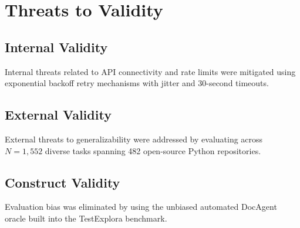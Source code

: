 \section{Threats to Validity}
\label{sec:threats}

\subsection{Internal Validity}
Internal threats related to API connectivity and rate limits were mitigated using exponential backoff retry mechanisms with jitter and 30-second timeouts.

\subsection{External Validity}
External threats to generalizability were addressed by evaluating across $N=1,552$ diverse tasks spanning 482 open-source Python repositories.

\subsection{Construct Validity}
Evaluation bias was eliminated by using the unbiased automated DocAgent oracle built into the TestExplora benchmark.

